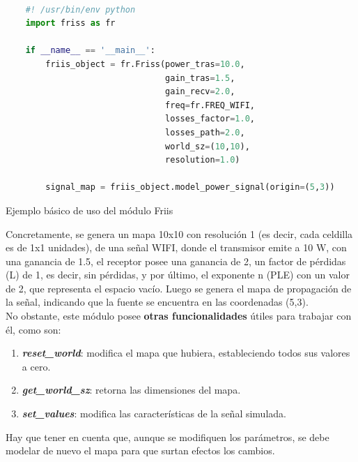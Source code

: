 \begin{code}[H]
    \begin{lstlisting}[language=Python]

    #! /usr/bin/env python
    import friss as fr

    if __name__ == '__main__':
        friis_object = fr.Friss(power_tras=10.0,
                                gain_tras=1.5,
                                gain_recv=2.0,
                                freq=fr.FREQ_WIFI,
                                losses_factor=1.0,
                                losses_path=2.0,
                                world_sz=(10,10),
                                resolution=1.0)

        signal_map = friis_object.model_power_signal(origin=(5,3))

\end{lstlisting}
\caption[Ejemplo básico de uso del módulo Friis]{Ejemplo básico de uso del módulo Friis}
\label{cod:friis_basics}
\end{code}

Concretamente, se genera un mapa 10x10 con resolución 1 (es decir, cada celdilla es de 1x1 unidades), de una señal WIFI, donde el transmisor emite a 10 W, con una ganancia de 1.5, el receptor posee una ganancia de 2, un factor de pérdidas (L) de 1, es decir, sin pérdidas, y por último, el exponente n (\ac{PLE}) con un valor de 2, que representa el espacio vacío. Luego se genera el mapa de propagación de la señal, indicando que la fuente se encuentra en las coordenadas (5,3).\\

No obstante, este módulo posee \textbf{otras funcionalidades} útiles para trabajar con él, como son:

\begin{enumerate}
    \item \textbf{\emph{reset\_world}}: modifica el mapa que hubiera, estableciendo todos sus valores a cero.

    \item \textbf{\emph{get\_world\_sz}}: retorna las dimensiones del mapa.

    \item \textbf{\emph{set\_values}}: modifica las características de la señal simulada.
\end{enumerate}

Hay que tener en cuenta que, aunque se modifiquen los parámetros, se debe modelar de nuevo el mapa para que surtan efectos los cambios.\\

